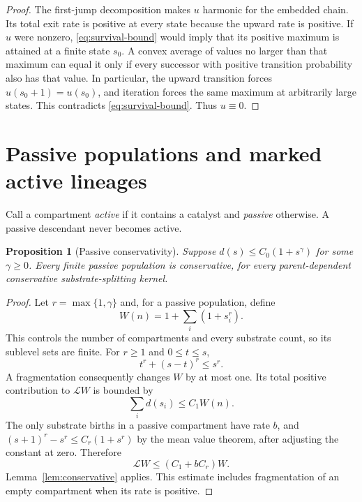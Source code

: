 \documentclass[11pt,a4paper]{article}
\newtheorem{proposition}[theorem]{Proposition}
\theoremstyle{remark}\newtheorem{remark}[theorem]{Remark}
\newcommand{\LL}{\mathcal L}
\begin{document}
\begin{proof}
The first-jump decomposition makes $u$ harmonic for the embedded chain. Its total exit rate is positive at every state because the upward rate is positive. If $u$ were nonzero, \eqref{eq:survival-bound} would imply that its positive maximum is attained at a finite state $s_0$. A convex average of values no larger than that maximum can equal it only if every successor with positive transition probability also has that value. In particular, the upward transition forces $u(s_0+1)=u(s_0)$, and iteration forces the same maximum at arbitrarily large states. This contradicts \eqref{eq:survival-bound}. Thus $u\equiv0$.
\end{proof}

\section{Passive populations and marked active lineages}\label{sec:lift}

Call a compartment \emph{active} if it contains a catalyst and \emph{passive} otherwise. A passive descendant never becomes active.

\begin{proposition}[Passive conservativity]\label{prop:passive}
Suppose $d(s)\le C_0(1+s^\gamma)$ for some $\gamma\ge0$. Every finite passive population is conservative, for every parent-dependent conservative substrate-splitting kernel.
\end{proposition}
\begin{proof}
Let $r=\max\{1,\gamma\}$ and, for a passive population, define
\[
W(n)=1+\sum_i(1+s_i^r).
\]
This controls the number of compartments and every substrate count, so its sublevel sets are finite. For $r\ge1$ and $0\le t\le s$,
\[
t^r+(s-t)^r\le s^r.
\]
A fragmentation consequently changes $W$ by at most one. Its total positive contribution to $\LL W$ is bounded by
\[
\sum_i d(s_i)\le C_1 W(n).
\]
The only substrate births in a passive compartment have rate $b$, and
$(s+1)^r-s^r\le C_r(1+s^r)$ by the mean value theorem, after adjusting the constant at zero. Therefore
\[
\LL W\le(C_1+bC_r)W.
\]
Lemma~\ref{lem:conservative} applies. This estimate includes fragmentation of an empty compartment when its rate is positive.
\end{proof}
\end{document}
